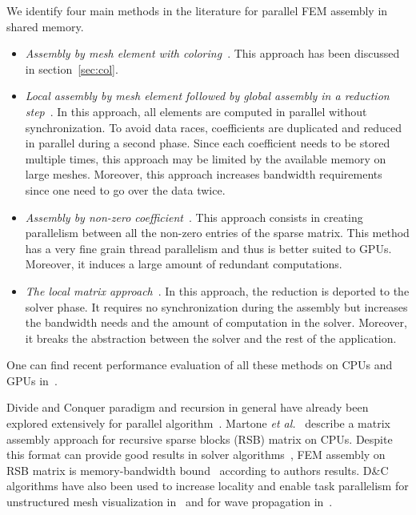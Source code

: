 \documentclass[10pt]{IOS-Book-Article}
\begin{document}
We identify four main methods in the literature for parallel FEM assembly in shared memory.
\begin{itemize}
\item \textit{Assembly by mesh element with coloring}~\cite{CPUfe}. This approach has been discussed in section~\ref{sec:col}.
\item \textit{Local assembly by mesh element followed by global assembly in a reduction step}~\cite{cecka2011assembly}.
In this approach, all elements are computed in parallel without synchronization. To avoid data races, coefficients are duplicated
and reduced in parallel during a second phase. Since each coefficient needs to be stored multiple times, this approach may be
limited by the available memory on large meshes. Moreover, this approach increases bandwidth requirements since one need to go over
the data twice.
\item \textit{Assembly by non-zero coefficient}~\cite{bolz2003sparse,cecka2011assembly}. This approach consists in creating parallelism
between all the non-zero entries of the sparse matrix. This method has a very fine grain thread parallelism
and thus is better suited to GPUs. Moreover, it induces a large amount of redundant computations.
\item \textit{The local matrix approach}~\cite{CPUGPUasm}. In this approach, the reduction is deported to the solver phase. It
requires no synchronization during the assembly but increases the bandwidth needs and the amount of computation in the solver.
Moreover, it breaks the abstraction between the solver and the rest of the application.
\end{itemize}
One can find recent performance evaluation of all these methods on CPUs and GPUs in~\cite{cecka2011assembly,CPUGPUasm}.

Divide and Conquer paradigm and recursion in general have already been explored extensively for parallel algorithm~\cite{div}.
Martone \textit{et al.}~\cite{RSBasm} describe a matrix assembly approach for recursive sparse blocks (RSB) matrix on CPUs.
Despite this format can provide good results in solver algorithms~\cite{RSBsolver}, FEM assembly on RSB matrix is memory-bandwidth bound~\cite{RSBasm} according to authors results.
D\&C algorithms have also been used to increase locality and enable task parallelism for unstructured mesh
visualization in~\cite{tvcg10,egpgv10,hppc10} and for wave propagation in~\cite{dc_specfem}.
\end{document}

